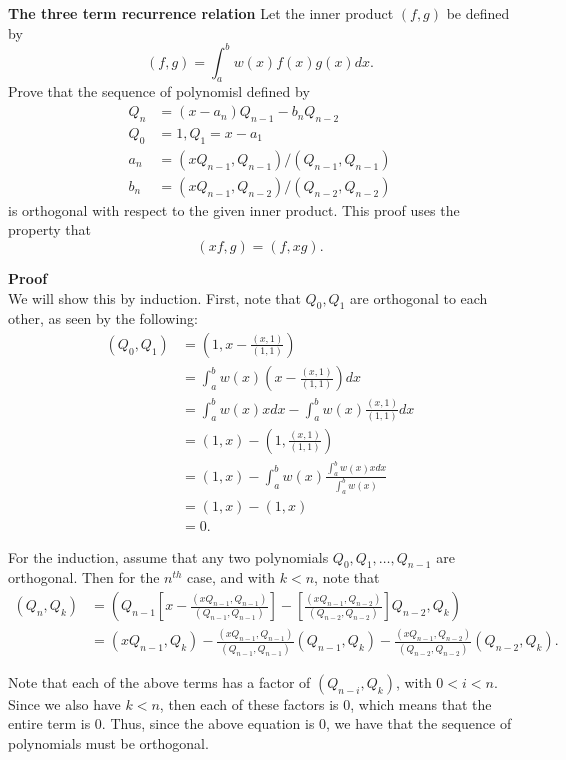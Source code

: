\textbf{The three term recurrence relation} Let the inner product $(f, g)$ be defined by $$ (f, g) = \int_a^b w(x) f(x) g(x) dx.$$ Prove that the sequence of polynomisl defined by
\begin{align*}
Q_n &= (x - a_n)Q_{n - 1} - b_n Q_{n - 2} \\
Q_0 &= 1, Q_1 = x - a_1 \\
a_n &= (xQ_{n - 1}, Q_{n - 1})/(Q_{n - 1}, Q_{n - 1}) \\
b_n &= (xQ_{n - 1}, Q_{n-2})/ (Q_{n - 2}, Q_{n - 2})
\end{align*}
is orthogonal with respect to the given inner product. This proof uses the property that $$(xf, g) = (f, xg).$$

\textbf{Proof}\\
We will show this by induction. First, note that $Q_0, Q_1$ are orthogonal to each other, as seen by the following:
\begin{align*}
(Q_0, Q_1) &= (1, x - \frac{(x, 1)}{(1,1)})\\
&= \int_a^b w(x) (x - \frac{(x, 1)}{(1,1)})dx\\
&= \int_a^b w(x) x dx - \int_a^b w(x) \frac{(x, 1)}{(1,1)} dx\\
&= (1, x) - (1, \frac{(x, 1)}{(1,1)}) \\
&= (1, x) - \int_a^b w(x) \frac{\int_a^b w(x) xdx}{\int_a^b w(x)} \\
&= (1, x) - (1, x)\\
&= 0. 
\end{align*}

For the induction, assume that any two polynomials $Q_0, Q_1, \ldots, Q_{n - 1}$ are orthogonal. Then for the $n^{th}$ case, and with $k < n$, note that 
\begin{align*}
(Q_n, Q_k) &= (Q_{n - 1} [x - \frac{(xQ_{n - 1}, Q_{n - 1})}{(Q_{n - 1}, Q_{n - 1})}] - [\frac{(xQ_{n - 1}, Q_{n - 2})}{(Q_{n - 2}, Q_{n - 2})}]Q_{n - 2}, Q_k)\\
&= (xQ_{n - 1}, Q_k) - \frac{(xQ_{n - 1}, Q_{n - 1})}{(Q_{n - 1}, Q_{n - 1})}(Q_{n - 1}, Q_k) - \frac{(xQ_{n - 1}, Q_{n - 2})}{(Q_{n - 2}, Q_{n - 2})}(Q_{n - 2}, Q_k).
\end{align*}

Note that each of the above terms has a factor of $(Q_{n - i}, Q_k)$, with $0 < i < n$. Since we also have $k < n$, then each of these factors is 0, which means that the entire term is 0. Thus, since the above equation is 0, we have that the sequence of polynomials must be orthogonal.